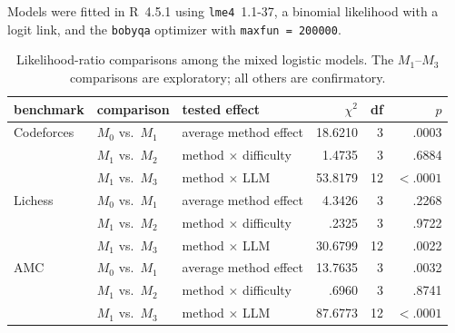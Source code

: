 Models were fitted in R~4.5.1 using \texttt{lme4}~1.1-37, a binomial likelihood with a logit link, and the \texttt{bobyqa} optimizer with \texttt{maxfun = 200000}.

\begin{table}[H]
\centering
\footnotesize
\setlength{\tabcolsep}{4pt}
\caption{Likelihood-ratio comparisons among the mixed logistic models.
The $M_1$--$M_3$ comparisons are exploratory; all others are confirmatory.}
\label{tab:mixed-model-comparisons}
\begin{tabular}{@{}lllrrr@{}}
\toprule
benchmark & comparison & tested effect & $\chi^2$ & df & $p$ \\
\midrule
Codeforces & $M_0$ vs.\ $M_1$ & average method effect & 18.6210 & 3 & .0003 \\
 & $M_1$ vs.\ $M_2$ & method $\times$ difficulty & 1.4735 & 3 & .6884 \\
 & $M_1$ vs.\ $M_3$ & method $\times$ LLM & 53.8179 & 12 & $<.0001$ \\
\midrule
Lichess & $M_0$ vs.\ $M_1$ & average method effect & 4.3426 & 3 & .2268 \\
 & $M_1$ vs.\ $M_2$ & method $\times$ difficulty & .2325 & 3 & .9722 \\
 & $M_1$ vs.\ $M_3$ & method $\times$ LLM & 30.6799 & 12 & .0022 \\
\midrule
AMC & $M_0$ vs.\ $M_1$ & average method effect & 13.7635 & 3 & .0032 \\
 & $M_1$ vs.\ $M_2$ & method $\times$ difficulty & .6960 & 3 & .8741 \\
 & $M_1$ vs.\ $M_3$ & method $\times$ LLM & 87.6773 & 12 & $<.0001$ \\
\bottomrule
\end{tabular}
\end{table}

